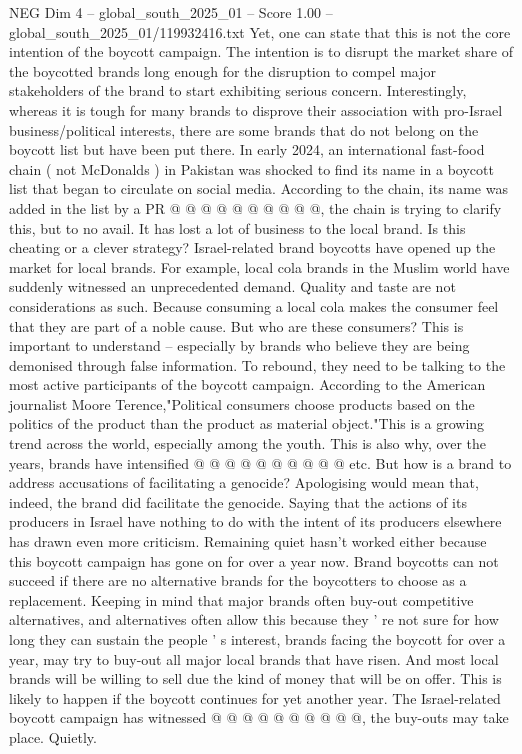 \begin{textsample}{NEG Dim 4 – global\_south\_2025\_01 – Score 1.00 – global\_south\_2025\_01/119932416.txt}
Yet, one can state that this is not the core intention of the boycott campaign.
The intention is to disrupt the market share of the boycotted brands long enough for the disruption to compel major stakeholders of the brand to start exhibiting serious concern.
Interestingly, whereas it is tough for many brands to disprove their association with pro-Israel business/political interests, there are some brands that do not belong on the boycott list but have been put there.
In early 2024, an international fast-food chain ( not McDonalds ) in Pakistan was shocked to find its name in a boycott list that began to circulate on social media.
According to the chain, its name was added in the list by a PR @ @ @ @ @ @ @ @ @ @, the chain is trying to clarify this, but to no avail.
It has lost a lot of business to the local brand.
Is this cheating or a clever strategy?
Israel-related brand boycotts have opened up the market for local brands.
For example, local cola brands in the Muslim world have suddenly witnessed an unprecedented demand.
Quality and taste are not considerations as such.
Because consuming a local cola makes the consumer feel that they are part of a noble cause.
But who are these consumers?
This is important to understand -- especially by brands who believe they are being demonised through false information.
To rebound, they need to be talking to the most active participants of the boycott campaign.
According to the American journalist Moore Terence,"Political consumers choose products based on the politics of the product than the product as material object."This is a growing trend across the world, especially among the youth.
This is also why, over the years, brands have intensified @ @ @ @ @ @ @ @ @ @ etc.
But how is a brand to address accusations of facilitating a genocide?
Apologising would mean that, indeed, the brand did facilitate the genocide.
Saying that the actions of its producers in Israel have nothing to do with the intent of its producers elsewhere has drawn even more criticism.
Remaining quiet hasn't worked either because this boycott campaign has gone on for over a year now.
Brand boycotts can not succeed if there are no alternative brands for the boycotters to choose as a replacement.
Keeping in mind that major brands often buy-out competitive alternatives, and alternatives often allow this because they ' re not sure for how long they can sustain the people ' s interest, brands facing the boycott for over a year, may try to buy-out all major local brands that have risen.
And most local brands will be willing to sell due the kind of money that will be on offer.
This is likely to happen if the boycott continues for yet another year.
The Israel-related boycott campaign has witnessed @ @ @ @ @ @ @ @ @ @, the buy-outs may take place.
Quietly.

\end{textsample}
